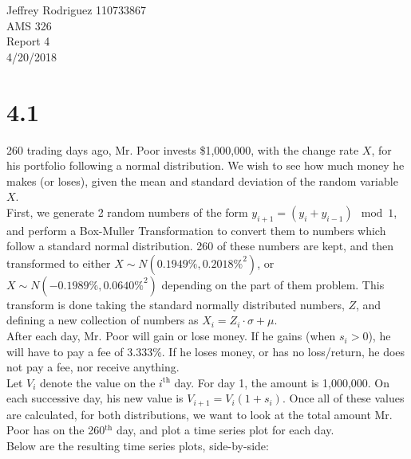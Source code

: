 \documentclass[12pt]{article}
\begin{document}
\begin{center}
Jeffrey Rodriguez 110733867\\AMS 326\\Report 4\\4/20/2018\\

\end{center}
\section*{4.1}
260 trading days ago, Mr. Poor invests \$1,000,000, with the change rate $X$, for his portfolio following a normal distribution. We wish to see how much money he makes (or loses), given the mean and standard deviation of the random variable $X$.
\\First, we generate 2 random numbers of the form $y_{i+1} =(y_i + y_{i-1})\mod1$, and perform a Box-Muller Transformation to convert them to numbers which follow a standard normal distribution. 260 of these numbers are kept, and then transformed to either $X\sim N(0.1949\%,0.2018\%^2)$, or $X\sim N(-0.1989\%,0.0640\%^2)$ depending on the part of them problem. This transform is done taking the standard normally distributed numbers, $Z$, and defining a new collection of numbers as $X_i = Z_i\cdot\sigma+\mu$.
\\After each day, Mr. Poor will gain or lose money. If he gains (when $s_i > 0$), he will have to pay a fee of 3.333\%.
If he loses money, or has no loss/return, he does not pay a fee, nor receive anything. 
\\Let $V_i$ denote the value on the $i^{\text{th}}$ day. For day 1, the amount is 1,000,000. On each successive day, his new value is $V_{i+1} = V_i(1 + s_i)$. Once all of these values are calculated, for both distributions, we want to look at the total amount Mr. Poor has on the 260$^\text{th}$ day, and plot a time series plot for each day. 
\\Below are the resulting time series plots, side-by-side:
\end{document}
